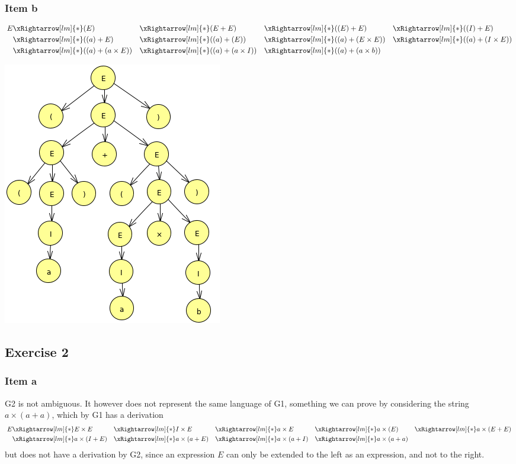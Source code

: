 {\subsubsection{Item b}
\begin{alignat*}{6}
	E
	&\xRightarrow[lm]{\ast} (E)
	&&\xRightarrow[lm]{\ast} (E+E)
	&&\xRightarrow[lm]{\ast} ((E)+E)
	&&\xRightarrow[lm]{\ast} ((I)+E) \\
	&\xRightarrow[lm]{\ast} ((a)+E)
	&&\xRightarrow[lm]{\ast} ((a)+(E)) 
	&&\xRightarrow[lm]{\ast} ((a)+(E \times E))
	&&\xRightarrow[lm]{\ast} ((a)+(I \times E)) \\ 
	&\xRightarrow[lm]{\ast} ((a)+(a \times E)) 
	&&\xRightarrow[lm]{\ast} ((a)+(a \times I)) 
	&&\xRightarrow[lm]{\ast} ((a)+(a \times b)) 
\end{alignat*}
\begin{center} \includegraphics[scale=0.45]{PA07_1b} \end{center}
\subsection{Exercise 2}
\subsubsection{Item a}
G2 is not ambiguous. It however does not represent the same language of G1, something we can prove by considering the string $a \times (a+a)$, which by G1 has a derivation
\begin{alignat*}{6}
	E
	&\xRightarrow[lm]{\ast} E \times E
	&&\xRightarrow[lm]{\ast} I \times E
	&&\xRightarrow[lm]{\ast} a \times E
	&&\xRightarrow[lm]{\ast} a \times (E)
	&&\xRightarrow[lm]{\ast} a \times (E+E) \\
	&\xRightarrow[lm]{\ast} a \times (I+E)
	&&\xRightarrow[lm]{\ast} a \times (a+E)
	&&\xRightarrow[lm]{\ast} a \times (a+I)
	&&\xRightarrow[lm]{\ast} a \times (a+a)
\end{alignat*}
but does not have a derivation by G2, since an expression $E$ can only be extended to the left as an expression, and not to the right.
}
